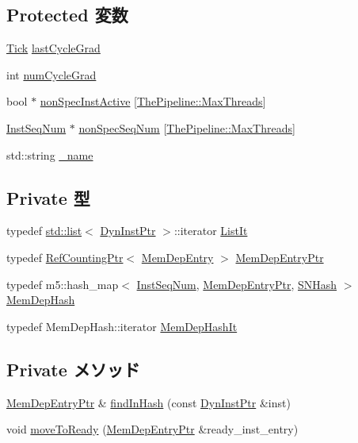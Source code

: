 \subsection*{Protected 変数}
\begin{DoxyCompactItemize}
\item 
\hyperlink{base_2types_8hh_a5c8ed81b7d238c9083e1037ba6d61643}{Tick} \hyperlink{classMemDepUnit_a5db9914f1c33ab7cef8fdc6037f98775}{lastCycleGrad}
\item 
int \hyperlink{classMemDepUnit_a9bd2235f4069b61f51af0d84d5115de5}{numCycleGrad}
\item 
bool $\ast$ \hyperlink{classMemDepUnit_aa27d1c9b589af0c77a81c490021c7dcb}{nonSpecInstActive} \mbox{[}\hyperlink{namespaceThePipeline_ac9c0bbe9cf27d93e08ea8ccc4096e633}{ThePipeline::MaxThreads}\mbox{]}
\item 
\hyperlink{inst__seq_8hh_a258d93d98edaedee089435c19ea2ea2e}{InstSeqNum} $\ast$ \hyperlink{classMemDepUnit_a899b1bc10d38a0f725495bf2108479a3}{nonSpecSeqNum} \mbox{[}\hyperlink{namespaceThePipeline_ac9c0bbe9cf27d93e08ea8ccc4096e633}{ThePipeline::MaxThreads}\mbox{]}
\item 
std::string \hyperlink{classMemDepUnit_aaf2ed934b37cbbd236fdd1b01a5f5005}{\_\-name}
\end{DoxyCompactItemize}
\subsection*{Private 型}
\begin{DoxyCompactItemize}
\item 
typedef \hyperlink{classstd_1_1list}{std::list}$<$ \hyperlink{classRefCountingPtr}{DynInstPtr} $>$::iterator \hyperlink{classMemDepUnit_a184cb829e22cc656acb41864f68f51ea}{ListIt}
\item 
typedef \hyperlink{classRefCountingPtr}{RefCountingPtr}$<$ \hyperlink{classMemDepUnit_1_1MemDepEntry}{MemDepEntry} $>$ \hyperlink{classMemDepUnit_a3ebb51dea989551d10194eb1b09cff41}{MemDepEntryPtr}
\item 
typedef m5::hash\_\-map$<$ \hyperlink{inst__seq_8hh_a258d93d98edaedee089435c19ea2ea2e}{InstSeqNum}, \hyperlink{classRefCountingPtr}{MemDepEntryPtr}, \hyperlink{structSNHash}{SNHash} $>$ \hyperlink{classMemDepUnit_a0552beec197948e07bf69cb6ea45407e}{MemDepHash}
\item 
typedef MemDepHash::iterator \hyperlink{classMemDepUnit_a4579af5e07d66f86f6e8aa193e0f926a}{MemDepHashIt}
\end{DoxyCompactItemize}
\subsection*{Private メソッド}
\begin{DoxyCompactItemize}
\item 
\hyperlink{classRefCountingPtr}{MemDepEntryPtr} \& \hyperlink{classMemDepUnit_a7c1fadef5550f6fd9382259565101bec}{findInHash} (const \hyperlink{classRefCountingPtr}{DynInstPtr} \&inst)
\item 
void \hyperlink{classMemDepUnit_ac1e743ad9d95132dd76847a784259e11}{moveToReady} (\hyperlink{classRefCountingPtr}{MemDepEntryPtr} \&ready\_\-inst\_\-entry)
\end{DoxyCompactItemize}
